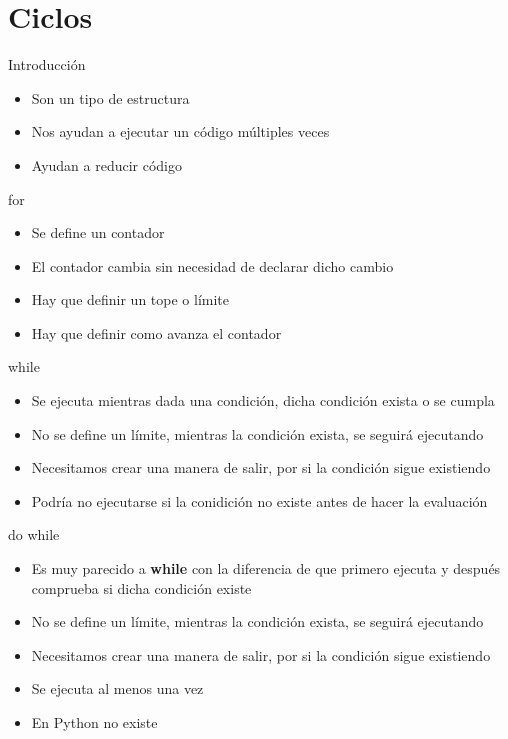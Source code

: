 \documentclass{beamer}
\begin{document}
\section{Ciclos}

\begin{frame}{Introducci\'on}
    \begin{itemize}
        \item Son un tipo de estructura
        \item Nos ayudan a ejecutar un c\'odigo m\'ultiples veces
        \item Ayudan a reducir c\'odigo
    \end{itemize}
\end{frame}

\begin{frame}{for}
    \begin{itemize}
        \item Se define un contador
        \item El contador cambia sin necesidad de declarar dicho cambio
        \item Hay que definir un tope o l\'imite
        \item Hay que definir como avanza el contador
    \end{itemize}
\end{frame}


\begin{frame}{while}
    \begin{itemize}
        \item Se ejecuta mientras dada una condici\'on, dicha condici\'on exista o se cumpla
        \item No se define un l\'imite, mientras la condici\'on exista, se seguir\'a ejecutando 
        \item Necesitamos crear una manera de salir, por si la condici\'on sigue existiendo
        \item Podr\'ia no ejecutarse si la conidici\'on no existe antes de hacer la evaluaci\'on
    \end{itemize}
\end{frame}

\begin{frame}{do while}
    \begin{itemize}
            \item Es muy parecido a \textbf{while} con la diferencia de que primero ejecuta y despu\'es comprueba si dicha condici\'on existe
            \item No se define un l\'imite, mientras la condici\'on exista, se seguir\'a ejecutando
            \item Necesitamos crear una manera de salir, por si la condici\'on sigue existiendo
            \item Se ejecuta al menos una vez
            \item En Python no existe
        \end{itemize}
\end{frame}
\end{document}

